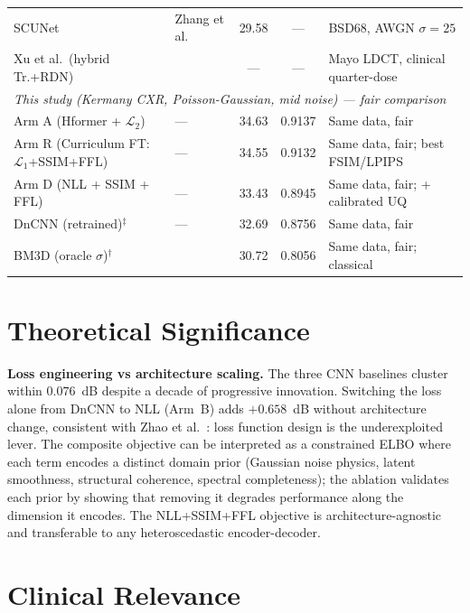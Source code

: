 \documentclass[12pt, a4paper, twoside, openright]{book}
\begin{document}
\begin{landscape}
\begin{longtable}{llccl}
SCUNet         & Zhang et al.\ \citeyear{zhang_practical_2023} & 29.58 & ---    & BSD68, AWGN $\sigma{=}25$ \\
Xu et al.\ (hybrid Tr.+RDN) & \citeyear{xuLowdoseComputedTomography2025} & --- & --- & Mayo LDCT, clinical quarter-dose \\
\midrule
\multicolumn{5}{l}{\textit{This study (Kermany CXR, Poisson-Gaussian, mid noise) — fair comparison}} \\
Arm A (Hformer + $\mathcal{L}_2$)             & ---                          & 34.63 & 0.9137 & Same data, fair \\
Arm R (Curriculum FT: $\mathcal{L}_1$+SSIM+FFL) & ---                       & 34.55 & 0.9132 & Same data, fair; best FSIM/LPIPS \\
Arm D (NLL + SSIM + FFL)                      & ---                          & 33.43 & 0.8945 & Same data, fair; + calibrated UQ \\
DnCNN (retrained)$^\ddagger$                  & ---                          & 32.69 & 0.8756 & Same data, fair \\
BM3D (oracle $\sigma$)$^\dagger$              & \citeyear{dabov_image_2007}  & 30.72 & 0.8056 & Same data, fair; classical \\
%
\end{longtable}
\end{landscape}

\section{Theoretical Significance}
\label{sec:disc:theory}

\textbf{Loss engineering vs architecture scaling.} The three CNN baselines cluster within $0.076$~dB despite a decade of progressive innovation. Switching the loss alone from DnCNN to NLL (Arm~B) adds $+0.658$~dB without architecture change, consistent with Zhao et al.\ \cite{zhao_loss_2017}: loss function design is the underexploited lever. The composite objective can be interpreted as a constrained ELBO where each term encodes a distinct domain prior (Gaussian noise physics, latent smoothness, structural coherence, spectral completeness); the ablation validates each prior by showing that removing it degrades performance along the dimension it encodes. The NLL+SSIM+FFL objective is architecture-agnostic and transferable to any heteroscedastic encoder-decoder.

\section{Clinical Relevance}
\label{sec:disc:clinical}
\end{document}
